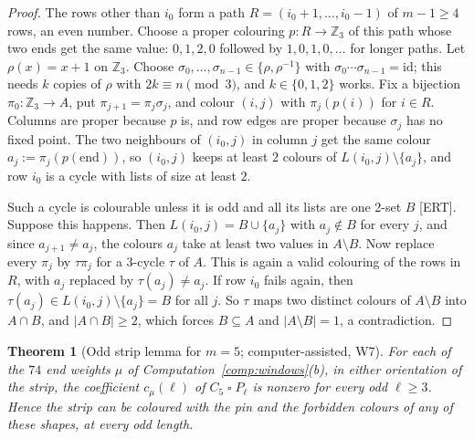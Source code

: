 \documentclass[11pt]{article}
\theoremstyle{plain}
\newtheorem{theorem}{Theorem}[section]
\theoremstyle{definition}
\theoremstyle{remark}
\newcommand{\T}{\mathbin{\square}}
\newcommand{\Z}{\mathbb{Z}}
\begin{document}
\begin{proof}
The rows other than $i_0$ form a path $R = (i_0 + 1, \dots, i_0 - 1)$ of $m - 1 \ge 4$ rows, an even
number. Choose a proper colouring $p : R \to \Z_3$ of this path whose two ends get the same value:
$0, 1, 2, 0$ followed by $1, 0, 1, 0, \dots$ for longer paths. Let $\rho(x) = x + 1$ on $\Z_3$.
Choose $\sigma_0, \dots, \sigma_{n-1} \in \{\rho, \rho^{-1}\}$ with $\sigma_0 \cdots
\sigma_{n-1} = \mathrm{id}$; this needs $k$ copies of $\rho$ with $2k \equiv n \pmod 3$, and $k \in
\{0, 1, 2\}$ works. Fix a bijection $\pi_0 : \Z_3 \to A$, put $\pi_{j+1} = \pi_j \sigma_j$, and
colour $(i, j)$ with $\pi_j(p(i))$ for $i \in R$. Columns are proper because $p$ is, and row edges
are proper because $\sigma_j$ has no fixed point. The two neighbours of $(i_0, j)$ in column $j$
get the same colour $a_j := \pi_j(p(\text{end}))$, so $(i_0, j)$ keeps at least $2$ colours of
$L(i_0, j) \setminus \{a_j\}$, and row $i_0$ is a cycle with lists of size at least $2$.

Such a cycle is colourable unless it is odd and all its lists are one 2-set $B$ [ERT]. Suppose
this happens. Then $L(i_0, j) = B \cup \{a_j\}$ with $a_j \notin B$ for every $j$, and since
$a_{j+1} \ne a_j$, the colours $a_j$ take at least two values in $A \setminus B$. Now replace every
$\pi_j$ by $\tau \pi_j$ for a 3-cycle $\tau$ of $A$. This is again a valid colouring of the rows in
$R$, with $a_j$ replaced by $\tau(a_j) \ne a_j$. If row $i_0$ fails again, then $\tau(a_j) \in
L(i_0, j) \setminus \{a_j\} = B$ for all $j$. So $\tau$ maps two distinct colours of $A \setminus B$
into $A \cap B$, and $|A \cap B| \ge 2$, which forces $B \subseteq A$ and $|A \setminus B| = 1$, a
contradiction.
\end{proof}

\begin{theorem}[Odd strip lemma for $m = 5$; computer-assisted, W7]\label{thm:strip5}
For each of the $74$ end weights $\mu$ of Computation~\ref{comp:windows}(b), in either
orientation of the strip, the coefficient $c_\mu(\ell)$ of $C_5 \T P_\ell$ is nonzero for
\emph{every} odd $\ell \ge 3$. Hence the strip can be coloured with the pin and the forbidden
colours of any of these shapes, at every odd length.
\end{theorem}
\end{document}
